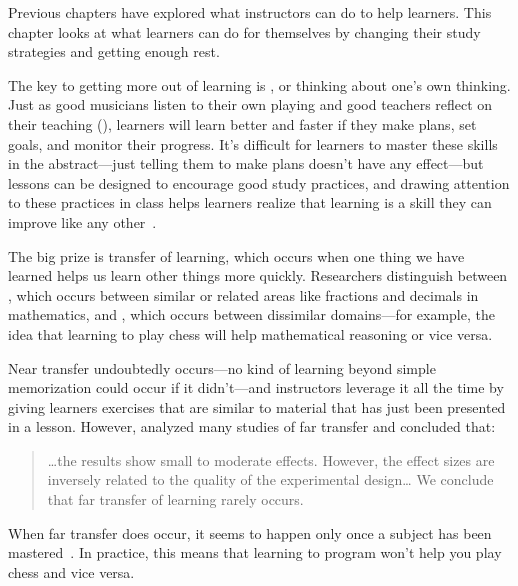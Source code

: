 
Previous chapters have explored what instructors can do to help learners.
This chapter looks at what learners can do for themselves
by changing their study strategies and getting enough rest.

The key to getting more out of learning is ,
or thinking about one's own thinking.
Just as good musicians listen to their own playing
and good teachers reflect on their teaching (),
learners will learn better and faster if they make plans,
set goals,
and monitor their progress.
It's difficult for learners to master these skills in the abstract---just telling them
to make plans doesn't have any effect---but
lessons can be designed to encourage good study practices,
and drawing attention to these practices in class
helps learners realize that learning is a skill they can improve like any other~\cite{McGu2015,Miya2018}.

The big prize is transfer of learning,
which occurs when one thing we have learned helps us learn other things more quickly.
Researchers distinguish between ,
which occurs between similar or related areas like fractions and decimals in mathematics,
and ,
which occurs between dissimilar domains---for example,
the idea that learning to play chess will help mathematical reasoning or vice versa.

Near transfer undoubtedly occurs---no kind of learning
beyond simple memorization could occur if it didn't---and
instructors leverage it all the time
by giving learners exercises that are similar to material that has just been presented in a lesson.
However,
\cite{Sala2017} analyzed many studies of far transfer
and concluded that:

\begin{quote}

  {\ldots}the results show small to moderate effects.
  However, the effect sizes are inversely related to the quality of the experimental design{\ldots}
  We conclude that far transfer of learning rarely occurs.

\end{quote}

When far transfer does occur,
it seems to happen only once a subject has been mastered~\cite{Gick1987}.
In practice,
this means that learning to program won't help you play chess and vice versa.

